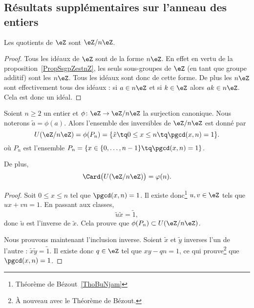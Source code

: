 \subsection{Résultats supplémentaires sur l'anneau des entiers}

\begin{corollary}       \label{CORooLINXooBlUKPG}
    Les quotients de \( \eZ\) sont \( \eZ/n\eZ\).
\end{corollary}

\begin{proof}
    Tous les idéaux de \( \eZ\) sont de la forme \( n\eZ\). En effet en vertu de la proposition~\ref{PropSsgpZestnZ}, les seuls sous-groupes de \( \eZ\) (en tant que groupe additif) sont les \( n\eZ\). Tous les idéaux sont donc de cette forme. De plus les \( n\eZ\) sont effectivement tous des idéaux : si \( a\in n\eZ\) et si \( k\in \eZ\) alors \( ak\in n\eZ\). Cela est donc un idéal.
\end{proof}

\begin{proposition}     \label{PropZpintssiprempUzn}
    Soient \( n\geq 2\) un entier et \( \phi\colon \eZ\to \eZ/n\eZ\) la surjection canonique. Nous noterons \( \tilde a=\phi(a)\). Alors l'ensemble des inversibles de \( \eZ/n\eZ\) est donné par
    \begin{equation}
        U(\eZ/n\eZ)=\phi(P_n)=\{ \tilde x\tq 0\leq x\leq n\tq\pgcd(x,n)=1 \}.
    \end{equation}
    où \( P_n\) est l'ensemble $P_n=\{ x\in\{ 0,\ldots,n-1 \}\tq\pgcd(x,n)=1 \}$.

    De plus,
    \begin{equation}
        \Card\big( U(\eZ/n\eZ) \big)=\varphi(n).
    \end{equation}
\end{proposition}

\begin{proof}
    Soit \( 0\leq x\leq n\) tel que \( \pgcd(x,n)=1\). Il existe donc\footnote{Théorème de Bézout~\ref{ThoBuNjam}} \( u,v\in\eZ\) tels que \( ux+vn=1\). En passant aux classes,
    \begin{equation}
        \tilde u\tilde x=\tilde 1,
    \end{equation}
    donc \( \tilde u\) est l'inverse de \( \tilde x\). Cela prouve que \( \phi(P_n)\subset U(\eZ/n\eZ)\).

    Nous prouvons maintenant l'inclusion inverse. Soient \( \tilde x\) et \( \tilde y\) inverses l'un de l'autre : $\tilde x\tilde y=\tilde 1$. Il existe donc \( q\in\eZ\) tel que \( xy-qn=1\), ce qui prouve\footnote{À nouveau avec le Théorème de Bézout.} que \( \pgcd(x,n)=1\).
\end{proof}

